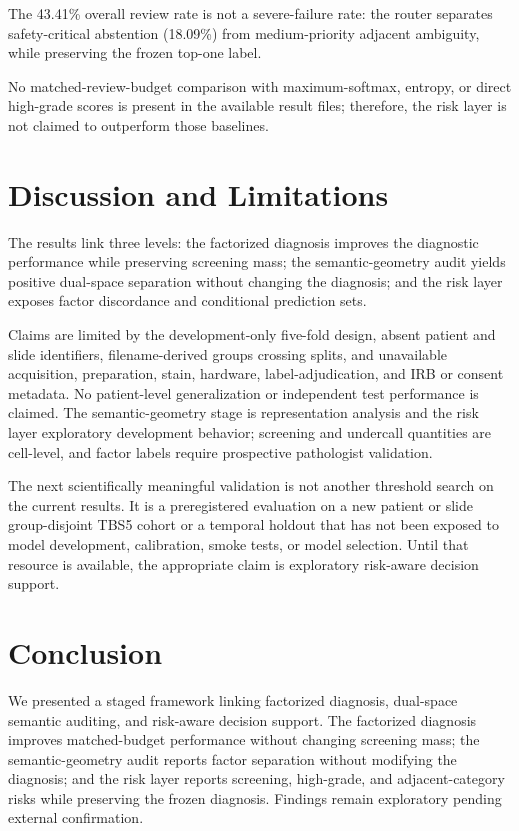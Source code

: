 \documentclass[conference]{IEEEtran}
\begin{document}
The 43.41\% overall review rate is not a severe-failure rate: the router
separates safety-critical abstention (18.09\%) from medium-priority
adjacent ambiguity, while preserving the frozen top-one label.

No matched-review-budget comparison with maximum-softmax, entropy, or
direct high-grade scores is present in the available result files;
therefore, the risk layer is not claimed to outperform those baselines.

\section{Discussion and Limitations}
\label{sec:discussion}
The results link three levels: the factorized diagnosis improves the
diagnostic performance while preserving screening mass; the
semantic-geometry audit yields positive dual-space separation without
changing the diagnosis; and the risk layer exposes factor discordance and
conditional prediction sets.

Claims are limited by the development-only five-fold design, absent
patient and slide identifiers, filename-derived groups crossing splits,
and unavailable acquisition, preparation, stain, hardware,
label-adjudication, and IRB or consent metadata. No patient-level
generalization or independent test performance is claimed. The
semantic-geometry stage is representation analysis and the risk layer
exploratory development behavior; screening and undercall quantities are
cell-level, and factor labels require prospective pathologist validation.

The next scientifically meaningful validation is not another threshold
search on the current results. It is a preregistered evaluation on a new
patient or slide group-disjoint TBS5 cohort or a temporal holdout that
has not been exposed to model development, calibration, smoke tests, or
model selection. Until that resource is available, the appropriate claim
is exploratory risk-aware decision support.

\section{Conclusion}
\label{sec:conclusion}
We presented a staged framework linking factorized diagnosis, dual-space
semantic auditing, and risk-aware decision support. The factorized
diagnosis improves matched-budget performance without changing screening
mass; the semantic-geometry audit reports factor separation without
modifying the diagnosis; and the risk layer reports screening,
high-grade, and adjacent-category risks while preserving the frozen
diagnosis. Findings remain exploratory pending external confirmation.
\end{document}
